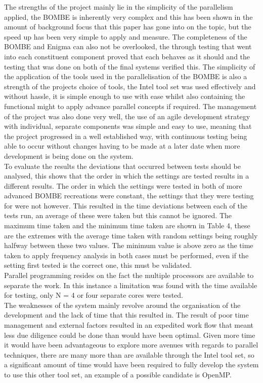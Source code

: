 \documentclass[12pt,a4paper]{article}
\begin{document}
The strengths of the project mainly lie in the simplicity of the parallelism applied, the BOMBE is inherently very complex and this has been shown in the amount of background focus that this paper has gone into on the topic, but the speed up has been very simple to apply and measure. The completeness of the BOMBE and Enigma can also not be overlooked, the through testing that went into each constituent component proved that each behaves as it should and the testing that was done on both of the final systems verified this. The simplicity of the application of the tools used in the parallelisation of the BOMBE is also a strength of the projects choice of tools, the Intel tool set was used effectively and without hassle, it is simple enough to use with ease whilst also containing the functional might to apply advance parallel concepts if required. The management of the project was also done very well, the use of an agile development strategy with individual, separate components was simple and easy to use, meaning that the project progressed in a well established way, with continuous testing being able to occur without changes having to be made at a later date when more development is being done on the system. \\

To evaluate the results the deviations that occurred between tests should be analysed, this shows that the order in which the settings are tested results in a different results. The order in which the settings were tested in both of more advanced BOMBE recreations were constant, the settings that they were testing for were not however. This resulted in the time deviations between each of the tests run, an average of these were taken but this cannot be ignored. The maximum time taken and the minimum time taken are shown in Table 4, these are the extremes with the average time taken with random settings being roughly halfway between these two values. The minimum value is above zero as the time taken to apply frequency analysis in both cases must be performed, even if the setting first tested is the correct one, this must be validated.\\

Parallel programming resides on the fact the multiple processors are available to separate the work. In this instance a limitation was found with the time available for testing, only N = 4 or four separate cores were tested.\\

The weaknesses of the system mainly revolve around the organisation of the development and the lack of time that this resulted in. The result of poor time management and external factors resulted in an expedited work flow that meant less due diligence could be done than would have been optimal. Given more time it would have been advantageous to explore more avenues with regards to parallel techniques, there are many more than are available through the Intel tool set, so a significant amount of time would have been required to fully develop the system to use this other tool set, an example of a possible candidate is OpenMP.\\
\end{document}
